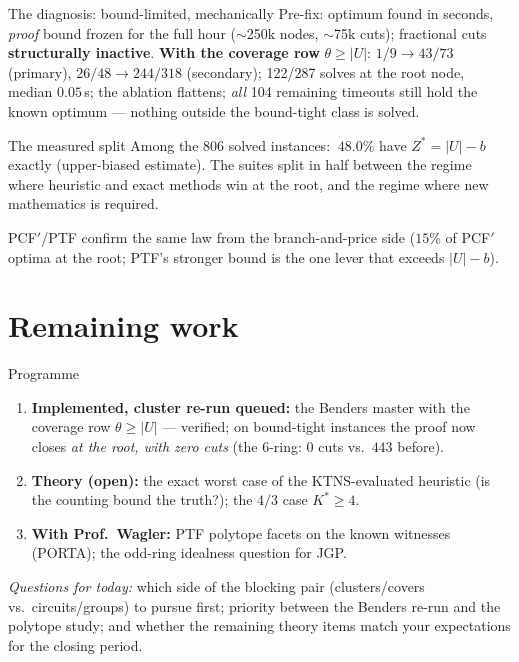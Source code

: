 \documentclass[10pt]{beamer}
\newcommand{\U}{U}\newcommand{\Kst}{K^{\ast}}\newcommand{\Zst}{Z^{\ast}}
\begin{document}
\begin{frame}{The diagnosis: bound-limited, mechanically}
Pre-fix: optimum found in seconds, \emph{proof} bound frozen for the full hour
($\sim$250k nodes, $\sim$75k cuts); fractional cuts \textbf{structurally
inactive}. \textbf{With the coverage row} $\theta\ge|\U|$: $1/9\to43/73$
(primary), $26/48\to244/318$ (secondary); 122/287 solves at the root node,
median $0.05$\,s; the ablation flattens; \emph{all} 104 remaining timeouts
still hold the known optimum --- nothing outside the bound-tight class is
solved.
\vspace{2mm}
\begin{block}{The measured split}
Among the $806$ solved instances: $\ 48.0\%$ have $\Zst=|\U|-b$ exactly
(upper-biased estimate). The suites split in half between the regime where
heuristic and exact methods win at the root, and the regime where new
mathematics is required.
\end{block}
PCF$'$/PTF confirm the same law from the branch-and-price side
($15\%$ of PCF$'$ optima at the root; PTF's stronger bound is the one lever
that exceeds $|\U|-b$).
\end{frame}

\section{Remaining work}
\begin{frame}{Programme}
\begin{enumerate}
  \item \textbf{Implemented, cluster re-run queued:} the Benders master with
        the coverage row $\theta\ge|\U|$ --- verified; on bound-tight
        instances the proof now closes \emph{at the root, with zero cuts}
        (the $6$-ring: $0$ cuts vs.\ $443$ before).
  \item \textbf{Theory (open):} the exact worst case of the KTNS-evaluated heuristic
        (is the counting bound the truth?); the $4/3$ case $\Kst\ge4$.
  \item \textbf{With Prof.\ Wagler:} PTF polytope facets on the known
        witnesses (PORTA); the odd-ring idealness question for JGP.
\end{enumerate}
\vspace{2mm}
\emph{Questions for today:} which side of the blocking pair (clusters/covers
vs.\ circuits/groups) to pursue first; priority between the Benders re-run and
the polytope study; and whether the remaining theory items match your
expectations for the closing period.
\end{frame}
\end{document}
